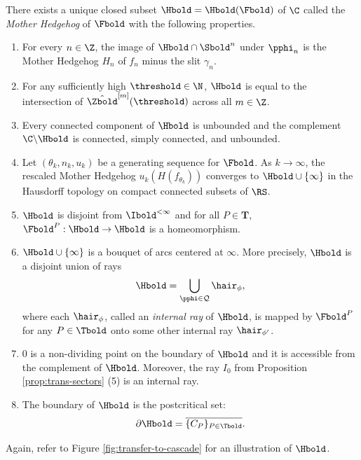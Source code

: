 \documentclass{amsart}
\begin{document}
\begin{proposition}
\label{prop:trans-mother}
    There exists a unique closed subset $\Hbold = \Hbold(\Fbold)$ of $\C$ called the \emph{Mother Hedgehog} of $\Fbold$ with the following properties.
    \begin{enumerate}
        \item For every $n\in\Z$, the image of $\Hbold \cap \Sbold^n$ under $\pphi_n$ is the Mother Hedgehog $H_n$ of $f_n$ minus the slit $\gamma_n$.
        \item For any sufficiently high $\threshold \in \N$, $\Hbold$ is equal to the intersection of $\hat{\Zbold}^{[m]}(\threshold)$ across all $m \in \Z$. 
        \item Every connected component of $\Hbold$ is unbounded and the complement $\C \backslash \Hbold$ is connected, simply connected, and unbounded.
        \item Let $(\theta_k, n_k, u_k)$ be a generating sequence for $\Fbold$. 
        As $k \to \infty$, the rescaled Mother Hedgehog $u_k (H(f_{\theta_k}))$ converges to $\Hbold \cup \{\infty\}$ in the Hausdorff topology on compact connected subsets of $\RS$.
        \item $\Hbold$ is disjoint from $\Ibold^{<\infty}$ and for all $P \in \mathbf{T}$, $\Fbold^{P} : \Hbold \to \Hbold$ is a homeomorphism. 
        \item $\Hbold \cup \{\infty\}$ is a bouquet of arcs centered at $\infty$. More precisely, $\Hbold$ is a disjoint union of rays
        \[
            \Hbold = \bigcup_{\pphi \in \mathcal{Q}} \hair_\phi,
        \]
        where each $\hair_\phi$, called an \emph{internal ray} of $\Hbold$, is mapped by $\Fbold^P$ for any $P \in \Tbold$ onto some other internal ray $\hair_{\phi'}$.
        \item $0$ is a non-dividing point on the boundary of $\Hbold$ and it is accessible from the complement of $\Hbold$. Moreover, the ray $I_0$ from Proposition \ref{prop:trans-sectors} (5) is an internal ray.
        \item The boundary of $\Hbold$ is the postcritical set:
        \[
            \partial \Hbold = \overline{ \{ C_P \}_{P \in \Tbold} }.
        \]
    \end{enumerate}
\end{proposition}

Again, refer to Figure \ref{fig:transfer-to-cascade} for an illustration of $\Hbold$.
\end{document}
